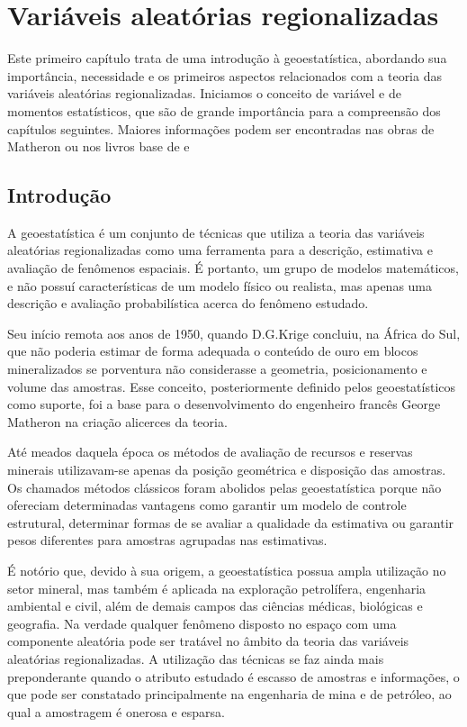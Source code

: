 


\chapter{Variáveis aleatórias regionalizadas}

Este primeiro capítulo trata de uma introdução à geoestatística, abordando sua importância, necessidade e os primeiros aspectos relacionados com a teoria das variáveis aleatórias regionalizadas. Iniciamos o conceito de variável e de momentos estatísticos, que são de grande importância para a compreensão dos capítulos seguintes. Maiores informações podem ser encontradas nas obras de Matheron \cite{matheron1963principles} ou nos livros base de \cite{isaaks1989applied} e \cite{goovaerts1997geostatistics}


\section{Introdução} 

A geoestatística é um conjunto de técnicas que utiliza a teoria das variáveis aleatórias regionalizadas como uma ferramenta para a descrição, estimativa e avaliação de fenômenos espaciais. É portanto, um grupo de modelos matemáticos, e não possuí características de um modelo físico ou realista, mas apenas uma descrição e avaliação probabilística acerca do fenômeno estudado. 

Seu início remota aos anos de 1950, quando D.G.Krige concluiu, na África do Sul, que não poderia estimar de forma adequada o conteúdo de ouro em blocos mineralizados se porventura não considerasse a geometria, posicionamento e volume das amostras. Esse conceito, posteriormente definido pelos geoestatísticos como suporte, foi a base para o desenvolvimento do engenheiro francês George Matheron na criação alicerces da teoria. 

Até meados daquela época os métodos de avaliação de recursos e reservas minerais utilizavam-se apenas da posição geométrica e disposição das amostras. Os chamados métodos clássicos foram abolidos pelas geoestatística porque não ofereciam determinadas vantagens como garantir um modelo de controle estrutural, determinar formas de se avaliar a qualidade da estimativa ou garantir pesos diferentes para amostras agrupadas nas estimativas.  

É notório que, devido à sua origem, a geoestatística possua ampla utilização no setor mineral, mas também é aplicada na exploração petrolífera, engenharia ambiental e civil, além de demais campos das ciências médicas, biológicas e geografia. Na verdade qualquer fenômeno disposto no espaço com uma componente aleatória pode ser tratável no âmbito da teoria das variáveis aleatórias regionalizadas. A utilização das técnicas se faz ainda mais preponderante quando o atributo estudado é escasso de amostras e informações, o que pode ser constatado principalmente na engenharia de mina e de petróleo, ao qual a amostragem é onerosa e esparsa.

